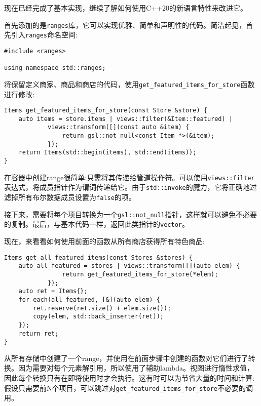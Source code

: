 现在已经完成了基本实现，继续了解如何使用C++20的新语言特性来改进它。


首先添加的是\texttt{ranges}库，它可以实现优雅、简单和声明性的代码。简洁起见，首先引入\texttt{ranges}命名空间:

\begin{lstlisting}[style=styleCXX]
#include <ranges>

using namespace std::ranges;
\end{lstlisting}

将保留定义商家、商品和商店的代码，使用\texttt{get\_featured\_items\_for\_store}函数进行修改:

\begin{lstlisting}[style=styleCXX]
Items get_featured_items_for_store(const Store &store) {
	auto items = store.items | views::filter(&Item::featured) |
			views::transform([](const auto &item) {
				return gsl::not_null<const Item *>(&item);
			});
	return Items(std::begin(items), std::end(items));
}
\end{lstlisting}

在容器中创建range很简单:只需将其传递给管道操作符。可以使用\texttt{views::filter}表达式，将成员指针作为谓词传递给它。由于\texttt{std::invoke}的魔力，它将正确地过滤掉所有布尔数据成员设置为\texttt{false}的项。

接下来，需要将每个项目转换为一个\texttt{gsl::not\_null}指针，这样就可以避免不必要的复制。最后，与基本代码一样，返回此类指针的\texttt{vector}。

现在，来看看如何使用前面的函数从所有商店获得所有特色商品:

\begin{lstlisting}[style=styleCXX]
Items get_all_featured_items(const Stores &stores) {
	auto all_featured = stores | views::transform([](auto elem) {
				return get_featured_items_for_store(*elem);
			});
	auto ret = Items{};
	for_each(all_featured, [&](auto elem) {
		ret.reserve(ret.size() + elem.size());
		copy(elem, std::back_inserter(ret));
	});
	return ret;
}
\end{lstlisting}

从所有存储中创建了一个range，并使用在前面步骤中创建的函数对它们进行了转换。因为需要对每个元素解引用，所以使用了辅助lambda。视图进行惰性求值，因此每个转换只有在即将使用时才会执行。这有时可以为节省大量的时间和计算:假设只需要前N个项目，可以跳过对\texttt{get\_featured\_items\_for\_store}不必要的调用。

